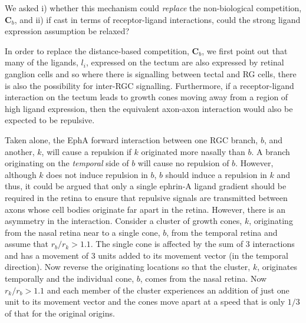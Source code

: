 \documentclass[11pt, a4paper]{article}
\begin{document}
We asked i) whether this mechanism could \emph{replace} the non-biological
competition, $\mathbf{C}_b$, and ii) if cast in terms of receptor-ligand
interactions, could the strong ligand expression assumption be relaxed?





In order to replace the distance-based competition, $\mathbf{C}_b$, we first
point out that many of the ligands, $l_i$, expressed on the tectum are also
expressed by retinal ganglion cells and so where there is signalling between
tectal and RG cells, there is also the possibility for inter-RGC
signalling. Furthermore, if a receptor-ligand interaction on the tectum leads
to growth cones moving away from a region of high ligand expression, then the
equivalent axon-axon interaction would also be expected to be repulsive.

Taken alone, the EphA forward interaction between one RGC branch, $b$, and
another, $k$, will cause a repulsion if $k$ originated more nasally than
$b$. A branch originating on the \emph{temporal} side of $b$ will cause no
repulsion of $b$. However, although $k$ does not induce repulsion in $b$, $b$
should induce a repulsion in $k$ and thus, it could be argued that only a
single ephrin-A ligand gradient should be required in the retina to ensure
that repulsive signals are transmitted between axons whose cell bodies
originate far apart in the retina. However, there is an asymmetry in the
interaction. Consider a cluster of growth cones, $k$, originating from the
nasal retina near to a single cone, $b$, from the temporal retina and assume
that $r_b/r_k>1.1$. The single cone is affected by the sum of 3 interactions
and has a movement of 3 units added to its movement vector (in the temporal
direction). Now reverse the originating locations so that the cluster, $k$,
originates temporally and the individual cone, $b$, comes from the nasal
retina. Now $r_k/r_b>1.1$ and each member of the cluster experiences an
addition of just one unit to its movement vector and the cones move apart at a
speed that is only $1/3$ of that for the original origins.
\end{document}
